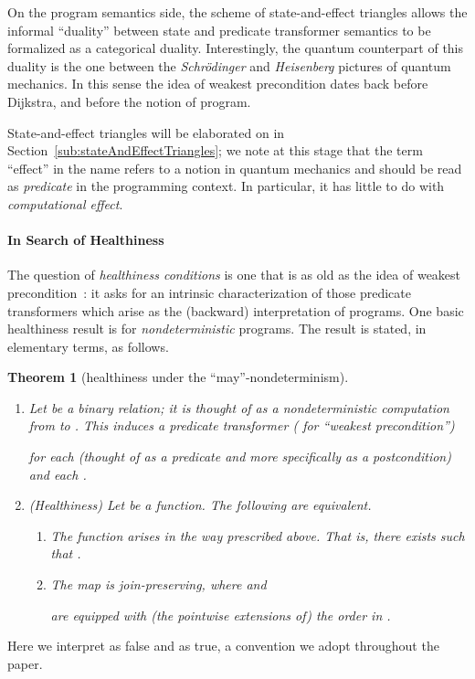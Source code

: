 \documentclass[9pt, preprint]{sigplanconf}
\theoremstyle{theorem}
\newtheorem{theorem}{Theorem}[section]
\theoremstyle{definition}
\begin{document}
On the program semantics side,
the scheme of state-and-effect triangles
allows
the informal ``duality'' between  state and predicate transformer
semantics to be formalized as a
categorical duality. Interestingly, the quantum counterpart of this
duality is the one between the \emph{Schr\"{o}dinger} and
\emph{Heisenberg} pictures of quantum mechanics. In this sense the idea
of weakest precondition dates back before Dijkstra, and before the
notion of program.

 State-and-effect triangles will be
elaborated on in Section~\ref{sub:stateAndEffectTriangles}; we note at this
stage that the term ``effect'' in the name refers to a notion in quantum
mechanics and should be read as \emph{predicate} in the programming
context. In particular, it has little to do with \emph{computational
effect}.


\paragraph{In Search of Healthiness}
The question of \emph{healthiness conditions} is one that is as old as
the idea of weakest precondition~\cite{Dijkstra76}: it asks for an intrinsic characterization of those predicate
  transformers which arise as the (backward) interpretation of
  programs.
One basic healthiness result is for \emph{nondeterministic}
programs.  The result is stated, in elementary terms, as follows.
\begin{theorem}[healthiness under the ``may''-nondeterminism]
\label{thm:healthiness-nondet-elementary}
 \begin{enumerate}
  \item Let  be a binary relation; it is thought
	of as a nondeterministic computation from   to . This
	 induces a predicate transformer ( for
	``weakest precondition'')

	for each  (thought of as a \emph{predicate} and
	more specifically as a \emph{postcondition}) and each .
  \item (Healthiness) Let  be a function. The following
	are equivalent.
	\begin{enumerate}
	 \item The function  arises  in
	       the way prescribed above. That is, there exists
	        such that
	       .
	 \item The map  is \emph{join-preserving}, where  and
	       
	       are equipped with (the pointwise extensions of) the order
	        in .
	\end{enumerate}
\end{enumerate}
\end{theorem}
\noindent
Here we
interpret  as false and  as true, a convention we adopt throughout the paper.
\end{document}
